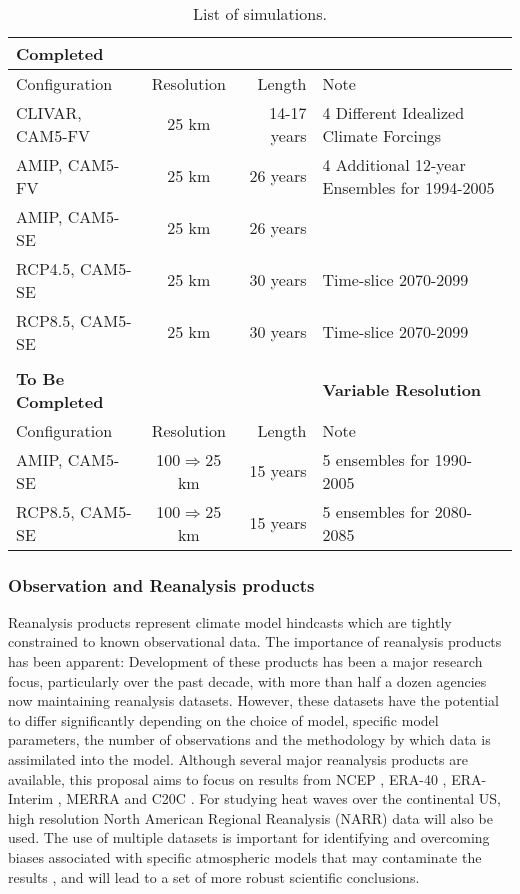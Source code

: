 \documentclass[11pt]{article}
\begin{document}
\begin{table} 
\begin{center}
\caption{List of simulations.\label{t:runs} }
\\
\begin{tabular}{l c r l}
\textbf{Completed} \\
\hline
Configuration & Resolution & Length & Note \\ 
\hline
CLIVAR, CAM5-FV & 25 km & 14-17 years & 4 Different Idealized Climate Forcings  \\
AMIP, CAM5-FV & 25 km & 26 years    & 4 Additional 12-year Ensembles for 1994-2005 \\
AMIP, CAM5-SE & 25 km & 26 years    & \\
RCP4.5, CAM5-SE & 25 km & 30 years    & Time-slice 2070-2099 \\
RCP8.5, CAM5-SE & 25 km & 30 years    & Time-slice 2070-2099 \\
\hline
\\
\textbf{To Be Completed} & & & \textbf{Variable Resolution}\\
\hline
Configuration & Resolution & Length & Note \\ 
\hline
AMIP, CAM5-SE & 100$\Rightarrow$25 km & 15 years    & 5 ensembles for 1990-2005 \\
RCP8.5, CAM5-SE & 100$\Rightarrow$25 km & 15 years    & 5 ensembles for 2080-2085 \\
\hline
\end{tabular}
\end{center}
\end{table}

\subsubsection{Observation and Reanalysis products}

Reanalysis products represent climate model hindcasts which are tightly constrained to known observational data.  The importance of reanalysis products has been apparent:  Development of these products has been a major research focus, particularly over the past decade, with more than half a dozen agencies now maintaining reanalysis datasets.  However, these datasets have the potential to differ significantly depending on the choice of model, specific model parameters, the number of observations and the methodology by which data is assimilated into the model.  Although several major reanalysis products are available, this proposal aims to focus on results from NCEP \citep{kalnay1996ncep}, ERA-40 \citep{uppala2005era}, ERA-Interim \citep{simmons2007era}, MERRA \citep{rienecker2011merra} and C20C \citep{compo2011twentieth}.  For studying heat waves over the continental US, high resolution North American Regional Reanalysis (NARR) data will also be used.  The use of multiple datasets is important for identifying and overcoming biases associated with specific atmospheric models that may contaminate the results \citep{jun2008spatial}, and will lead to a set of more robust scientific conclusions.
\end{document}
